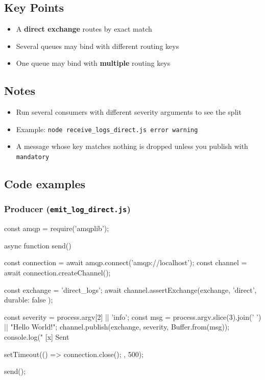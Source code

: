 \documentclass[11pt,a4paper]{article}
\begin{document}
\subsection*{Key Points}

\begin{itemize}\itemsep2pt
  \item A \textbf{direct exchange} routes by exact match
  \item Several queues may bind with different routing keys
  \item One queue may bind with \textbf{multiple} routing keys
\end{itemize}

\subsection*{Notes}

\begin{itemize}\itemsep2pt
  \item Run several consumers with different severity arguments to see the split
  \item Example: \lstinline|node receive_logs_direct.js error warning|
  \item A message whose key matches nothing is dropped unless you publish with
        \lstinline|mandatory|
\end{itemize}

\newpage
\subsection{Code examples}

\subsubsection*{Producer (\texttt{emit\_log\_direct.js})}
\begin{js}
const amqp = require('amqplib');

async function send() {
    const connection = await amqp.connect('amqp://localhost');
    const channel = await connection.createChannel();

    const exchange = 'direct_logs';
    await channel.assertExchange(exchange, 'direct', { durable: false });

    const severity = process.argv[2] || 'info';
    const msg = process.argv.slice(3).join(' ') || "Hello World!";
    channel.publish(exchange, severity, Buffer.from(msg));
    console.log(" [x] Sent %

    setTimeout(() => { connection.close(); }, 500);
}
send();
\end{js}
\end{document}
